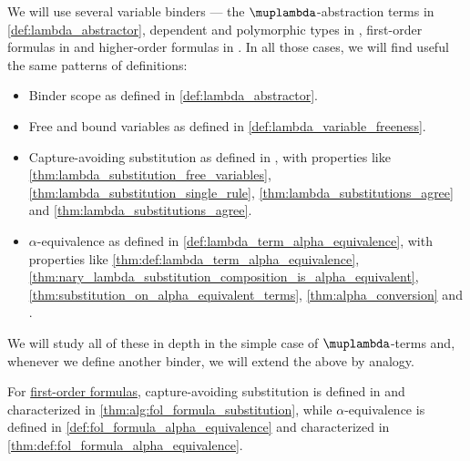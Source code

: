 \begin{remark}\label{rem:variable_binding_properties}
  We will use several variable binders --- the \( \muplambda \)-abstraction terms in \cref{def:lambda_abstractor}, dependent and polymorphic types in , first-order formulas in  and higher-order formulas in . In all those cases, we will find useful the same patterns of definitions:
  \begin{itemize}
    \item Binder scope as defined in \cref{def:lambda_abstractor}.
    \item Free and bound variables as defined in \cref{def:lambda_variable_freeness}.
    \item Capture-avoiding substitution as defined in , with properties like \cref{thm:lambda_substitution_free_variables}, \cref{thm:lambda_substitution_single_rule}, \cref{thm:lambda_substitutions_agree} and \cref{thm:lambda_substitutions_agree}.
    \item \( \alpha \)-equivalence as defined in \cref{def:lambda_term_alpha_equivalence}, with properties like \cref{thm:def:lambda_term_alpha_equivalence}, \cref{thm:nary_lambda_substitution_composition_is_alpha_equivalent}, \cref{thm:substitution_on_alpha_equivalent_terms}, \cref{thm:alpha_conversion} and .
  \end{itemize}

  We will study all of these in depth in the simple case of \( \muplambda \)-terms and, whenever we define another binder, we will extend the above by analogy.
\end{remark}
\begin{comments}
  \item For \hyperref[def:fol_formula]{first-order formulas}, capture-avoiding substitution is defined in  and characterized in \cref{thm:alg:fol_formula_substitution}, while \( \alpha \)-equivalence is defined in \cref{def:fol_formula_alpha_equivalence} and characterized in \cref{thm:def:fol_formula_alpha_equivalence}.
\end{comments}


